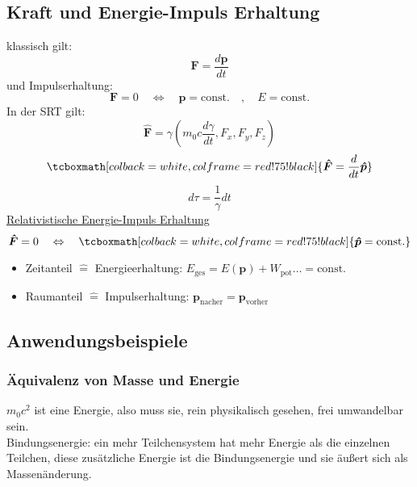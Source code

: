 \documentclass[titlepage,11pt,a4paper,ngerman]{report}
\newcommand{\tx}[1]{\textrm{#1}}
\newcommand{\const}{\tx{const.}}
\renewcommand{\vec}[1]{\boldsymbol{#1}}
\newcommand{\lcom}[1]{\color{MidnightBlue}#1\color{black}}
\newcommand{\rmbox}[1]{\tcboxmath[colback=white,colframe=red!75!black]{#1}}
\begin{document}

\subsection{Kraft und Energie-Impuls Erhaltung}
klassisch gilt:
\begin{equation*}
\vec{F} = \frac{d\vec{p}}{dt}
\end{equation*}
und Impulserhaltung:
\begin{equation*}
\vec{F} = 0 \quad \Leftrightarrow \quad \vec{p} = \const \quad , \quad E = \const
\end{equation*}
In der SRT gilt:
\begin{equation*}
\vec{\hat F} = \gamma (m_0 c \frac{d\gamma}{dt}, F_x, F_y, F_z)
\end{equation*}
\begin{equation*}
\rmbox{\vec{\hat F} = \frac{d}{dt} \vec{\hat{p}}}
\end{equation*}
\begin{equation*}
d \tau = \frac{1}{\gamma} dt
\end{equation*}
\underline{Relativistische Energie-Impuls Erhaltung}
\begin{equation*}
\vec{\hat{F}} = 0 \quad \Leftrightarrow \quad \rmbox{\vec{\hat{p}} = \const}
\end{equation*}
\begin{itemize}
	\item Zeitanteil $ \widehat{=} $ Energieerhaltung: $ E_{\tx{ges}} = E(\vec{p}) + W_{\tx{pot}} \dots = \const $
	\item Raumanteil $ \widehat{=} $ Impulserhaltung: $ \vec{p}_{\tx{nacher}} = \vec{p}_{\tx{vorher}} $
\end{itemize}

\subsection{Anwendungsbeispiele}
\subsubsection{Äquivalenz von Masse und Energie}
\lcom{$m_0 c^2$ ist eine Energie, also muss sie, rein physikalisch gesehen, frei umwandelbar sein.}\\

\lcom{Bindungsenergie: ein mehr Teilchensystem hat mehr Energie als die einzelnen Teilchen, diese zusätzliche Energie ist die Bindungsenergie und sie äußert sich als Massenänderung.}
\end{document}
